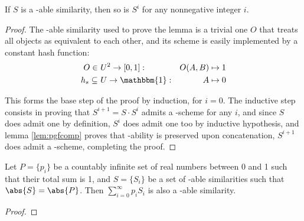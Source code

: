 \begin{lemma}\label{l:powersim}
    If $S$ is a \lsh-able similarity, then so is $S^i$ for any nonnegative integer $i$.
\end{lemma}

\begin{proof}
    The \lsh-able similarity used to prove the lemma is a trivial one $O$ that treats all objects as equivalent to each other, and its scheme is easily implemented by a constant hash function:
    \begin{align*}
        O         \in&\ U^2 \to [0, 1]    : & O(A, B) \mapsto 1 \\
        h_s \subseteq&\ U \to \mathbbm{1} : & A \mapsto 0
    \end{align*}

    This forms the base step of the proof by induction, for $i = 0$. The inductive step consists in proving that $S^{i + 1} = S \cdot S^i$ admits a \lsh-scheme for any $i$, and since $S$ does admit one by definition, $S^i$ does admit one too by inductive hypothesis, and lemma \ref{lem:pgfcomp} proves that \lsh-ability is preserved upon concatenation, $S^{i + 1}$ does admit a \lsh-scheme, completing the proof.
\end{proof}

\begin{lemma}[L4]\label{l:pgf_4}
    Let $P = \{p_i\}$ be a countably infinite set of real numbers between 0 and 1 such that their total sum is 1, and $S = \{S_i\}$ be a set of \lsh-able similarities such that $\abs{S} = \abs{P}$. Then $\sum_{i = 0}^{\infty} p_i S_i$ is also a \lsh-able similarity.
\end{lemma}

\begin{proof}

\end{proof}

